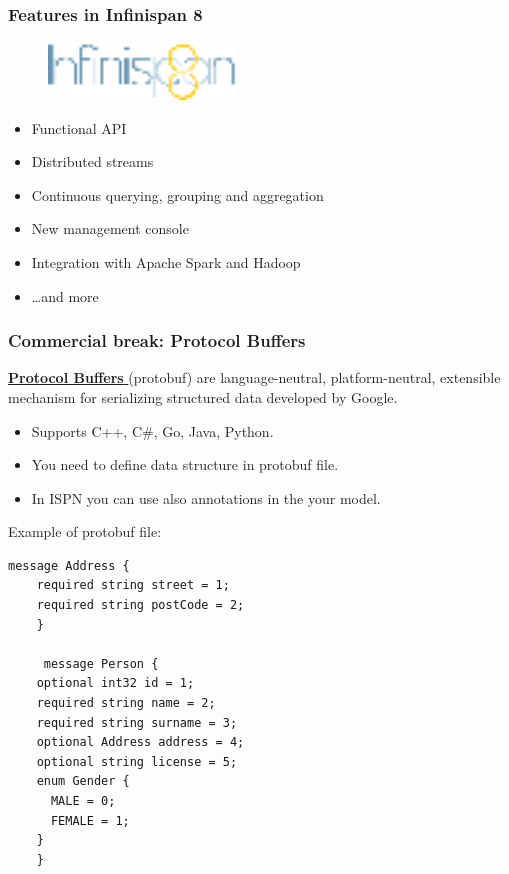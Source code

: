 \documentclass[10pt,utf8]{beamer}
\begin{document}
\begin{frame}
	\frametitle{Features in Infinispan 8}
	\begin{figure}
		\centering
		\includegraphics[width=5cm]{./img/infinispan8.eps}
	\end{figure}
  \begin{itemize}
    \item Functional API
		\item Distributed streams
		\item Continuous querying, grouping and aggregation
		\item New management console
		\item Integration with Apache Spark and Hadoop
		\item \dots and more
  \end{itemize}
\end{frame}

\begin{frame}[fragile]
	\frametitle{Commercial break: Protocol Buffers}
	\href{https://developers.google.com/protocol-buffers/}{\color{blue}\textbf{Protocol Buffers }} (protobuf) are language-neutral, platform-neutral, extensible mechanism for serializing 
	structured data developed by Google. \\ 
	\vspace{0.1cm}
	
	\begin{itemize}
		\item Supports C++, C\#, Go, Java, Python.
		\item You need to define data structure in protobuf file.
		\item In ISPN you can use also annotations in the your model.
	\end{itemize}
	
	Example of protobuf file:
	\begin{lstlisting}[style=Protobuf] 
	message Address {
    required string street = 1;
    required string postCode = 2;
	}

	 message Person {
    optional int32 id = 1;
    required string name = 2;
    required string surname = 3;
    optional Address address = 4;
    optional string license = 5;
    enum Gender {
      MALE = 0;
      FEMALE = 1;
    }                                                                                                                                                                                                                                         
	}                
	\end{lstlisting}
\end{frame}
\end{document}
